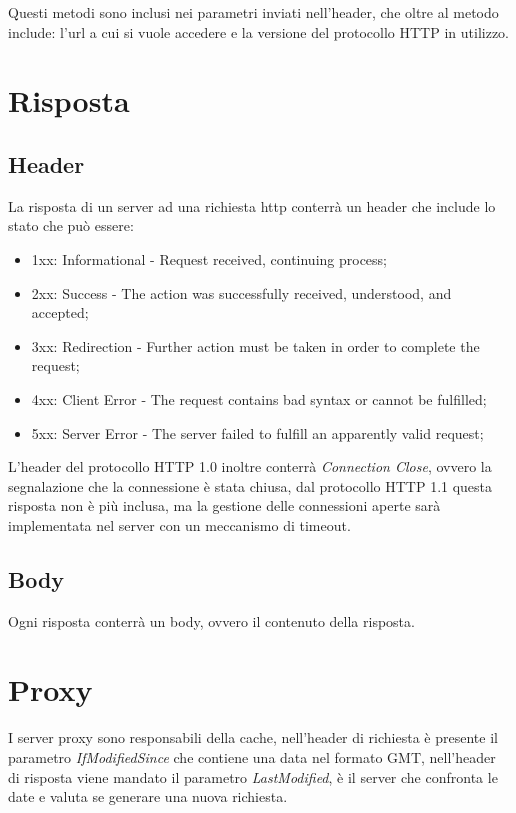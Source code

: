 Questi metodi sono inclusi nei parametri inviati nell'header, che oltre al
metodo include: l'url a cui si vuole accedere e la versione del protocollo
HTTP in utilizzo.

\section{Risposta}
\subsection{Header}
La risposta di un server ad una richiesta http conterrà un header che include
lo stato che può essere:
\begin{itemize}
     \item 1xx: Informational - Request received, continuing process;
     \item 2xx: Success - The action was successfully received, understood, and
       accepted;
     \item 3xx: Redirection - Further action must be taken in order to complete
       the request;
     \item 4xx: Client Error - The request contains bad syntax or cannot be
       fulfilled;
     \item 5xx: Server Error - The server failed to fulfill an apparently valid
       request;
\end{itemize}

L'header del protocollo HTTP 1.0 inoltre conterrà \emph{Connection Close},
ovvero la segnalazione che la connessione è stata chiusa, dal protocollo
HTTP 1.1 questa risposta non è più inclusa, ma la gestione delle connessioni
aperte sarà implementata nel server con un meccanismo di timeout.

\subsection{Body}
Ogni risposta conterrà un body, ovvero il contenuto della risposta.

\section{Proxy}
I server proxy sono responsabili della cache, nell'header di richiesta è
presente il parametro \emph{IfModifiedSince} che contiene una data nel formato
GMT, nell'header di risposta viene mandato il parametro \emph{LastModified},
è il server che confronta le date e valuta se generare una nuova richiesta.
